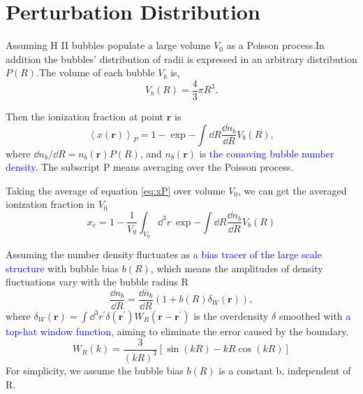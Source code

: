 \section{Perturbation Distribution}
	\label{sec:pert}
	Assuming  H II bubbles populate a large volume $V_0$ as a Poisson process.In addition the bubbles' distribution of radii is expressed in an arbitrary distribution $P(R)$.The volume of each bubble $V_b$ is,
	\begin{equation}
	 V_b(R) = \dfrac{4}{3}\pi R^3.
	\end{equation}
	
	Then the ionization fraction at point $\mathbf{r}$ is
	\begin{equation}
		\left<
			x(\textbf{r})
		\right>_P
		=
		1-\exp{
			-\int \dd{R}{
				\dfrac{
					\dd{n_b}}{\dd {R}
					}V_b(R)
				}
			},
		\label{eq:xP}
	\end{equation}
	where ${\dd{n_b}}/{\dd {R}} = n_b(\textbf{r})P(R)$, and $n_b(\textbf{r})$ is \textcolor{blue}{the comoving  bubble number density}. The subscript P means averaging over the Poisson process.
	
	Taking the average of equation \eqref{eq:xP} over volume $V_0$, we can get the averaged ionization fraction in $V_0$
	\begin{equation}
		x_e = 
		1-
		\dfrac{1}{V_0}\int_{V_0}\dd^3{r}~{\exp{-\int \dd{R}{\dfrac{\dd{n_b}}{\dd {R}}V_b(R)}}}
		\label{eq:x_e}
	\end{equation}
	
	Assuming the number density fluctuates as \textcolor{blue}{a bias tracer of the large scale structure} with bubble bias $b(R)$, which means the amplitudes of density fluctuations vary with the bubble radius R
	\begin{equation}
		\dfrac{\dd{n_b}}{\dd{R}}
		=\dfrac{
			\dd{\bar{n}_b}}{\dd{R}
			}
		(1+b(R)
		\delta_W(\textbf{r})),
		\label{eq:nb_fluc}
	\end{equation}
	where $\delta_W(\textbf{r}) = \int \dd^3{r^\prime}{\delta(\textbf{r}^\prime)W_R(\textbf{r}-\textbf{r}^\prime)}$ is the overdensity $\delta$ smoothed with \textcolor{blue}{a top-hat window function}, aiming to eliminate the error caused by the boundary.
	\begin{equation}
		W_R(k) = \dfrac{3}{(kR)^3}[\sin(kR)-kR\cos(kR)]
		\label{eq:W_R}
	\end{equation}
	For simplicity, we assume the bubble bias $b(R)$ is a constant b, independent of R.
	
